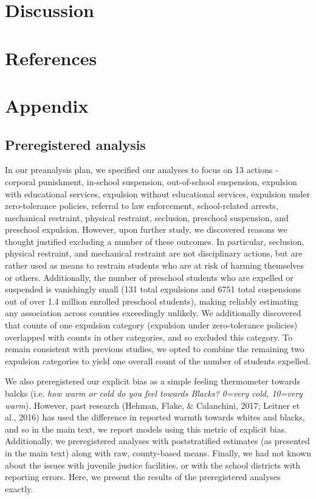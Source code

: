 \documentclass[english,floatsintext,man]{apa6}
\theoremstyle{definition}
\theoremstyle{definition}
\theoremstyle{remark}
\begin{document}
\section{Discussion}\label{discussion}

\newpage

\section{References}\label{references}

\newpage

\section{Appendix}\label{appendix}

\subsection{Preregistered analysis}\label{preregistered-analysis}

In our preanalysis plan, we specified our analyses to focus on 13
actions - corporal punishment, in-school suspension, out-of-school
suspension, expulsion with educational services, expulsion without
educational services, expulsion under zero-tolerance policies, referral
to law enforcement, school-related arrests, mechanical restraint,
physical restraint, seclusion, preschool suspension, and preschool
expulsion. However, upon further study, we discovered reasons we thought
justified excluding a number of these outcomes. In particular,
seclusion, physical restraint, and mechanical restraint are not
disciplinary actions, but are rather used as means to restrain students
who are at risk of harming themselves or others. Additionally, the
number of preschool students who are expelled or suspended is
vanishingly small (131 total expulsions and 6751 total suspensions out
of over 1.4 million enrolled preschool students), making reliably
estimating any association across counties exceedingly unlikely. We
additionally discovered that counts of one expulsion category (expulsion
under zero-tolerance policies) overlapped with counts in other
categories, and so excluded this category. To remain consistent with
previous studies, we opted to combine the remaining two expulsion
categories to yield one overall count of the number of students
expelled.

We also preregistered our explicit bias as a simple feeling thermometer
towards balcks (i.e. \emph{how warm or cold do you feel towards Blacks?
0=very cold, 10=very warm}). However, past research (Hehman, Flake, \&
Calanchini, 2017; Leitner et al., 2016) has used the difference in
reported warmth towards whites and blacks, and so in the main text, we
report models using this metric of explicit bias. Additionally, we
preregistered analyses with poststratified estimates (as presented in
the main text) along with raw, county-based means. Finally, we had not
known about the issues with juvenile justice facilities, or with the
school districts with reporting errors. Here, we present the results of
the preregistered analyses exactly.
\end{document}
